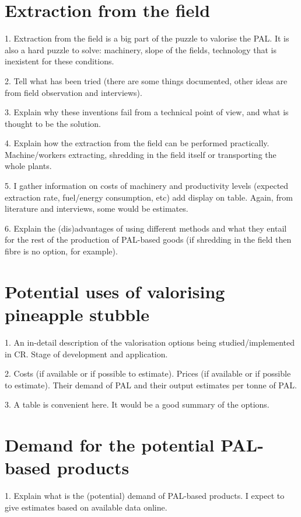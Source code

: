 \section{Extraction from the field}

1. Extraction from the field is a big part of the puzzle to valorise the PAL. It is also a hard puzzle to solve: machinery, slope of the fields, technology that is inexistent for these conditions. 

2. Tell what has been tried (there are some things documented, other ideas are from field observation and interviews). 

3. Explain why these inventions fail from a technical point of view, and what is thought to be the solution.

4. Explain how the extraction from the field can be performed practically. Machine/workers extracting, shredding in the field itself or transporting the whole plants.

5. I gather information on costs of machinery and productivity levels (expected extraction rate, fuel/energy consumption, etc) add display on table. Again, from literature and interviews, some would be estimates.

6. Explain the (dis)advantages of using different methods and what they entail for the rest of the production of PAL-based goods (if shredding in the field then fibre is no option, for example).

\section{Potential uses of valorising pineapple stubble}

1. An in-detail description of the valorisation options being studied/implemented in CR. Stage of development and application. 

2. Costs (if available or if possible to estimate). Prices (if available or if possible to estimate). Their demand of PAL and their output estimates per tonne of PAL. 

3. A table is convenient here. It would be a good summary of the options.

\section{Demand for the potential PAL-based products}

1. Explain what is the (potential) demand of PAL-based products. I expect to give estimates based on available data online.

